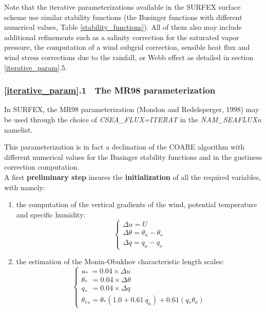 Note that the iterative parameterizations available in the SURFEX surface scheme use similar stability functions
(the Businger functions with different numerical values, Table \ref{stability_functions}).
All of them also may include additional refinements such as a salinity correction for the saturated vapor pressure, 
the computation of a wind subgrid correction, sensible heat flux and wind stress corrections due to the rainfall,
or Webb effect as detailed in section \ref{iterative_param}.5.

\subsubsection{\ref{iterative_param}.1 $~$ The MR98 parameterization\label{sct_MR98}}

In SURFEX, the MR98 parameterization (Mondon and Redelsperger, 1998) may be used through the choice of 
\textit{CSEA\_FLUX=\textquotesingle{}ITERAT\textquotesingle{}} in the \textit{NAM\_SEAFLUXn} namelist.

This parameterization is in fact a declination of the COARE algorithm with different numerical values for the Businger 
stability functions and in the gustiness correction computation. 
\\

A first \textbf{preliminary step} insures the \textbf{initialization} of all the required variables, with namely:
\begin{enumerate}
\item the computation of the vertical gradients of the wind, potential temperature and specific humidity:
\begin{equation}
\left\{
\begin{array}{l}
	\Delta u=U\\
	\Delta \theta=\theta_{a} - \theta_{s}\\
	\Delta q=q_{a} - q_{s}
\end{array}
\right.
\end{equation}

\item the estimation of the Monin-Obukhov characteristic length scales:
\begin{equation}
\left\{
\begin{array}{l}
	u_*~=0.04\times \Delta u\\
	\theta_{*}~~=0.04\times \Delta \theta\\
	q_{*}~~=0.04\times \Delta q\\
	{{\theta}_v}_{*}=\theta_{*}(1.0+0.61~q_{a})+0.61(q_{*} \theta_{a})
\end{array}
\right.
\end{equation}
\end{enumerate}

